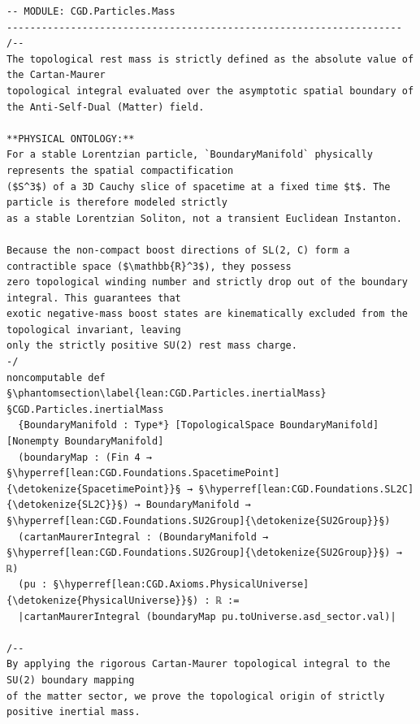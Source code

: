 \begin{verbatim}
-- MODULE: CGD.Particles.Mass
--------------------------------------------------------------------
/--
The topological rest mass is strictly defined as the absolute value of the Cartan-Maurer 
topological integral evaluated over the asymptotic spatial boundary of the Anti-Self-Dual (Matter) field.

**PHYSICAL ONTOLOGY:**
For a stable Lorentzian particle, `BoundaryManifold` physically represents the spatial compactification 
($S^3$) of a 3D Cauchy slice of spacetime at a fixed time $t$. The particle is therefore modeled strictly 
as a stable Lorentzian Soliton, not a transient Euclidean Instanton.

Because the non-compact boost directions of SL(2, C) form a contractible space ($\mathbb{R}^3$), they possess 
zero topological winding number and strictly drop out of the boundary integral. This guarantees that 
exotic negative-mass boost states are kinematically excluded from the topological invariant, leaving 
only the strictly positive SU(2) rest mass charge.
-/
noncomputable def §\phantomsection\label{lean:CGD.Particles.inertialMass}§CGD.Particles.inertialMass
  {BoundaryManifold : Type*} [TopologicalSpace BoundaryManifold] [Nonempty BoundaryManifold]
  (boundaryMap : (Fin 4 → §\hyperref[lean:CGD.Foundations.SpacetimePoint]{\detokenize{SpacetimePoint}}§ → §\hyperref[lean:CGD.Foundations.SL2C]{\detokenize{SL2C}}§) → BoundaryManifold → §\hyperref[lean:CGD.Foundations.SU2Group]{\detokenize{SU2Group}}§)
  (cartanMaurerIntegral : (BoundaryManifold → §\hyperref[lean:CGD.Foundations.SU2Group]{\detokenize{SU2Group}}§) → ℝ)
  (pu : §\hyperref[lean:CGD.Axioms.PhysicalUniverse]{\detokenize{PhysicalUniverse}}§) : ℝ :=
  |cartanMaurerIntegral (boundaryMap pu.toUniverse.asd_sector.val)|

/-- 
By applying the rigorous Cartan-Maurer topological integral to the SU(2) boundary mapping 
of the matter sector, we prove the topological origin of strictly positive inertial mass. 


\end{verbatim}
